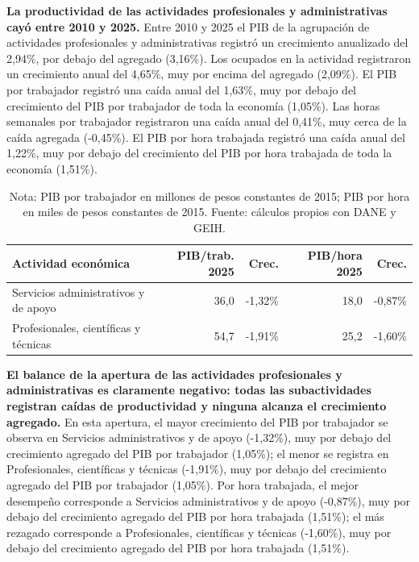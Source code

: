 \textbf{La productividad de las actividades profesionales y administrativas cayó entre 2010 y 2025.} Entre 2010 y 2025 el PIB de la agrupación de actividades profesionales y administrativas registró un crecimiento anualizado del 2,94\%, por debajo del agregado (3,16\%). Los ocupados en la actividad registraron un crecimiento anual del 4,65\%, muy por encima del agregado (2,09\%). El PIB por trabajador registró una caída anual del 1,63\%, muy por debajo del crecimiento del PIB por trabajador de toda la economía (1,05\%). Las horas semanales por trabajador registraron una caída anual del 0,41\%, muy cerca de la caída agregada (-0,45\%). El PIB por hora trabajada registró una caída anual del 1,22\%, muy por debajo del crecimiento del PIB por hora trabajada de toda la economía (1,51\%).

\begin{table}[H]
\centering
\caption{Productividad laboral de las actividades profesionales y administrativas, 2010--2025}
\label{tab:sector_m_n_zoom61}
\small
\begin{tabular}{p{}rrrr}
\toprule
Actividad económica & PIB/trab. 2025 & Crec. & PIB/hora 2025 & Crec. \\
\midrule
Servicios administrativos y de apoyo & 36,0 & -1,32\% & 18,0 & -0,87\% \\
Profesionales, científicas y técnicas & 54,7 & -1,91\% & 25,2 & -1,60\% \\
\bottomrule
\end{tabular}
\caption*{\footnotesize Nota: PIB por trabajador en millones de pesos constantes de 2015; PIB por hora en miles de pesos constantes de 2015. %
Fuente: cálculos propios con DANE y GEIH.}
\end{table}

\textbf{El balance de la apertura de las actividades profesionales y administrativas es claramente negativo: todas las subactividades registran caídas de productividad y ninguna alcanza el crecimiento agregado.} En esta apertura, el mayor crecimiento del PIB por trabajador se observa en Servicios administrativos y de apoyo (-1,32\%), muy por debajo del crecimiento agregado del PIB por trabajador (1,05\%); el menor se registra en Profesionales, científicas y técnicas (-1,91\%), muy por debajo del crecimiento agregado del PIB por trabajador (1,05\%). Por hora trabajada, el mejor desempeño corresponde a Servicios administrativos y de apoyo (-0,87\%), muy por debajo del crecimiento agregado del PIB por hora trabajada (1,51\%); el más rezagado corresponde a Profesionales, científicas y técnicas (-1,60\%), muy por debajo del crecimiento agregado del PIB por hora trabajada (1,51\%).

